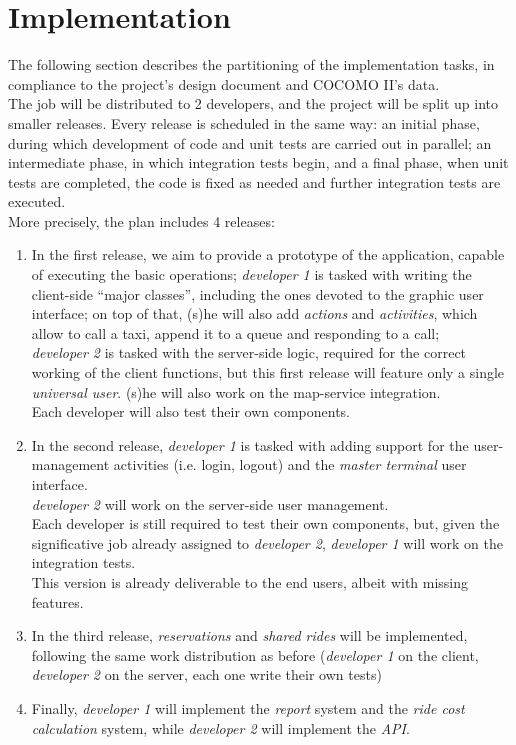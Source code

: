 \section{Implementation}
The following section describes the partitioning of the implementation tasks, in compliance to
the project's design document and COCOMO II's data. \\
The job will be distributed to 2 developers, and the project will be split up into
smaller releases.
Every release is scheduled in the same way: an initial phase, during which development of code and unit tests
are carried out in parallel; an intermediate phase, in which integration tests begin, and a final phase, when
unit tests are completed, the code is fixed as needed and further integration tests are executed. \\
More precisely, the plan includes 4 releases:
\begin{enumerate}
 \item In the first release, we aim to provide a prototype of the application, capable of executing the basic operations;
 \textit{developer 1} is tasked with writing the client-side ``major classes'', including the ones devoted to the graphic
 user interface; on top of that, (s)he will also add \textit{actions} and \textit{activities}, which allow to call a taxi,
 append it to a queue and responding to a call; \\
 \textit{developer 2} is tasked with the server-side logic, required for the correct working of the client functions,
 but this first release will feature only a single \textit{universal user}. (s)he will also work on the map-service
 integration. \\
 Each developer will also test their own components.
 \item In the second release, \textit{developer 1} is tasked with adding support for the user-management activities
 (i.e. login, logout) and the \textit{master terminal} user interface. \\
 \textit{developer 2} will work on the server-side user management. \\
 Each developer is still required to test their own components, but, given the significative job already assigned to
 \textit{developer 2}, \textit{developer 1} will work on the integration tests. \\
 This version is already deliverable to the end users, albeit with missing features.
 \item In the third release, \textit{reservations} and \textit{shared rides} will be implemented, following the
 same work distribution as before (\textit{developer 1} on the client, \textit{developer 2} on the server, each one
 write their own tests)
 \item Finally, \textit{developer 1} will implement the \textit{report} system and the \textit{ride cost calculation} system,
 while \textit{developer 2} will implement the \textit{API}.
\end{enumerate}


